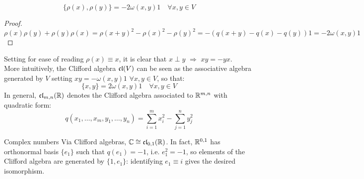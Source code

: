 
\begin{lemma}{}{}
  \begin{equation*}
    \{\rho(x) , \rho(y)\} = - 2 \omega(x,y) \mathit{1} \quad \forall x,y \in V
  \end{equation*}

  \tcblower

  \begin{proof}
    \begin{equation*}
      \rho(x) \rho(y) + \rho(y) \rho(x) = \rho(x + y)^2 - \rho(x)^2 - \rho(y)^2 = - \left( q(x + y) - q(x) - q(y) \right) \mathit{1} = - 2 \omega(x,y) \mathit{1}
    \end{equation*}
  \end{proof}
\end{lemma}

Setting for ease of reading $ \rho(x) \equiv x $, it is clear that $ x \perp y \,\,\Rightarrow\,\, xy = -yx $.\\
More intuitively, the Clifford algebra $ \mathfrak{cl}(V) $ can be seen as the associative algebra generated by $ V $ setting $ xy = - \omega(x,y)\mathit{1} \,\,\forall x,y \in V$, so that:
\begin{equation}
  \{x,y\} = 2 \omega(x,y)\mathit{1} \quad \forall x,y \in V
  \label{eq:cliff-alg}
\end{equation}
In general, $ \mathfrak{cl}_{m,n}(\mathbb{R}) $ denotes the Clifford algebra associated to $ \mathbb{R}^{m,n} $ with quadratic form:
\begin{equation*}
  q(x_1,\dots,x_m,y_1,\dots,y_n) = \sum_{i = 1}^{m} x_i^2 - \sum_{j = 1}^{n} y_j^2
\end{equation*}

\begin{example}{Complex numbers}{}
  Via Clifford algebras, $ \mathbb{C} \cong \mathfrak{cl}_{0,1}(\mathbb{R}) $. In fact, $ \mathbb{R}^{0,1} $ has orthonormal basis $ \{e_1\} $ such that $ q(e_1) = -1 $, i.e. $ e_1^2 = - \mathit{1} $, so elements of the Clifford algebra are generated by $ \{\mathit{1},e_1\} $: identifying $ e_1 \equiv i $ gives the desired isomorphism.
\end{example}

